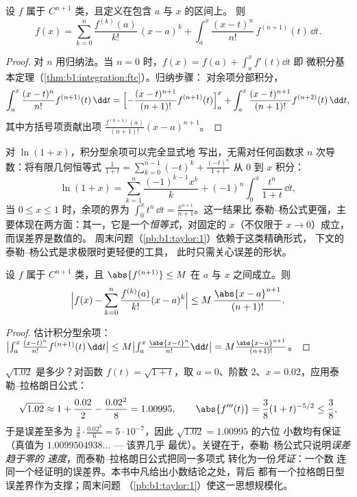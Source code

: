 \begin{theorem}[积分型余项的泰勒公式]\label{thm:b1:taylor:integral}
设 $f$ 属于 $C^{n+1}$ 类，且定义在包含 $a$ 与 $x$ 的区间上。
则
\[
f(x) = \sum_{k=0}^{n} \frac{f^{(k)}(a)}{k!}\,(x - a)^k
+ \int_a^x \frac{(x - t)^n}{n!}\, f^{(n+1)}(t)\, \dd t .
\]
\end{theorem}

\begin{proof}
对 $n$ 用归纳法。当 $n = 0$ 时，$f(x) = f(a) + \int_a^x f'(t)\dd t$ 即
微积分基本定理（\cref{thm:b1:integration:ftc}）。归纳步骤：
对余项分部积分，
\[
\int_a^x \frac{(x-t)^n}{n!} f^{(n+1)}(t)\,\dd t
= \Bigl[-\frac{(x-t)^{n+1}}{(n+1)!} f^{(n+1)}(t)\Bigr]_a^x
+ \int_a^x \frac{(x-t)^{n+1}}{(n+1)!} f^{(n+2)}(t)\,\dd t ,
\]
其中方括号项贡献出项 $\frac{f^{(n+1)}(a)}{(n+1)!}(x -
a)^{n+1}$。
\end{proof}

\begin{example}[精确展开及其余项]\label{ex:b1:taylor:lnexact}
对 $\ln(1 + x)$，积分型余项可以完全显式地
写出，无需对任何函数求 $n$ 次导数：将有限几何恒等式
$\frac{1}{1+t} =
\sum_{k=0}^{n-1}(-t)^k + \frac{(-t)^n}{1+t}$ 从 $0$ 到 $x$ 积分：
\[
\ln(1 + x) = \sum_{k=1}^{n} \frac{(-1)^{k-1}x^k}{k}
+ (-1)^n \int_0^x \frac{t^n}{1 + t}\,\dd t ,
\]
当 $0 \leq x \leq 1$ 时，余项的界为 $\int_0^x
t^n\,\dd t = \frac{x^{n+1}}{n+1}$。这一结果比
泰勒–杨公式更强，主要体现在两方面：其一，它是一个\emph{恒等式}，对固定的
$x$（不仅限于 $x \to 0$）成立，而误差界是数值的。
周末问题（\cref{pb:b1:taylor:1}）依赖于这类精确形式，
下文的泰勒–杨公式是求极限时更轻便的工具，
此时只需关心误差的形状。
\end{example}

\begin{theorem}[泰勒–拉格朗日不等式]\label{thm:b1:taylor:lagrange}
设 $f$ 属于 $C^{n+1}$ 类，且 $\abs{f^{(n+1)}} \leq M$ 在
$a$ 与 $x$ 之间成立。则
\[
\Bigl| f(x) - \sum_{k=0}^{n} \frac{f^{(k)}(a)}{k!}(x-a)^k \Bigr|
\leq M\, \frac{\abs{x - a}^{n+1}}{(n+1)!} .
\]
\end{theorem}

\begin{proof}
估计积分型余项：$\bigl|\int_a^x \frac{(x-t)^n}{n!}
f^{(n+1)}(t)\,\dd t\bigr| \leq M \bigl|\int_a^x
\frac{\abs{x-t}^n}{n!}\dd t\bigr| = M\frac{\abs{x-a}^{n+1}}{(n+1)!}$。
\end{proof}

\begin{example}[有保证的数值计算]\label{ex:b1:taylor:certified}
$\sqrt{1.02}$ 是多少？对函数 $f(t) =
\sqrt{1 + t}$，取 $a = 0$、阶数 $2$、$x = 0.02$，应用泰勒–拉格朗日公式：
\[
\sqrt{1.02} \approx 1 + \frac{0.02}{2} - \frac{0.02^2}{8}
= 1.00995 ,
\qquad
\abs{f'''(t)} = \frac{3}{8}(1+t)^{-5/2} \leq \frac 38 ,
\]
于是误差至多为 $\frac38 \cdot \frac{0.02^3}{6} =
5\cdot10^{-7}$，因此 $\sqrt{1.02} = 1.00995$ 的六位
小数均有保证（真值为 $1.0099504938\dots$ --- 该界几乎
最优）。关键在于，泰勒–杨公式只说明\emph{误差趋于零的
速度}，而泰勒–拉格朗日公式把同一多项式
转化为一份\emph{凭证}：一个数
连同一个经证明的误差界。本书中凡给出小数结论之处，背后
都有一个拉格朗日型误差界作为支撑；周末问题
（\cref{pb:b1:taylor:1}）使这一思想规模化。
\end{example}

